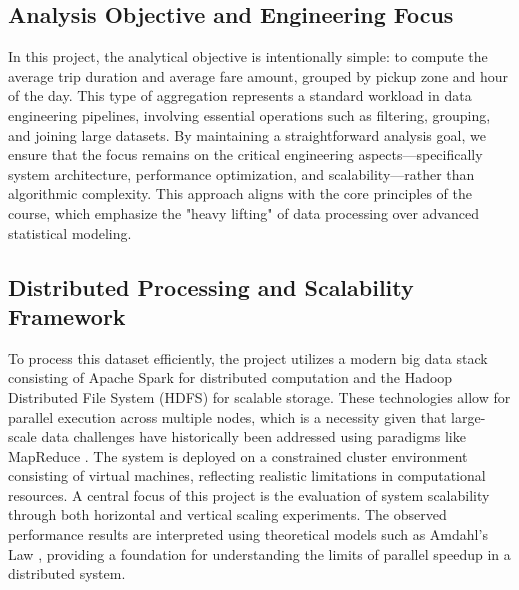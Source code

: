 \subsection{Analysis Objective and Engineering Focus}
In this project, the analytical objective is intentionally simple: to compute the average trip duration and average fare amount, grouped by pickup zone and hour of the day. This type of aggregation represents a standard workload in data engineering pipelines, involving essential operations such as filtering, grouping, and joining large datasets. By maintaining a straightforward analysis goal, we ensure that the focus remains on the critical engineering aspects—specifically system architecture, performance optimization, and scalability—rather than algorithmic complexity. This approach aligns with the core principles of the course, which emphasize the "heavy lifting" of data processing over advanced statistical modeling.

\subsection{Distributed Processing and Scalability Framework}
To process this dataset efficiently, the project utilizes a modern big data stack consisting of Apache Spark for distributed computation \cite{Zaharia2016} and the Hadoop Distributed File System (HDFS) for scalable storage. These technologies allow for parallel execution across multiple nodes, which is a necessity given that large-scale data challenges have historically been addressed using paradigms like MapReduce \cite{Dean2008}. The system is deployed on a constrained cluster environment consisting of virtual machines, reflecting realistic limitations in computational resources. A central focus of this project is the evaluation of system scalability through both horizontal and vertical scaling experiments. The observed performance results are interpreted using theoretical models such as Amdahl's Law \cite{Amdahl1967}, providing a foundation for understanding the limits of parallel speedup in a distributed system.